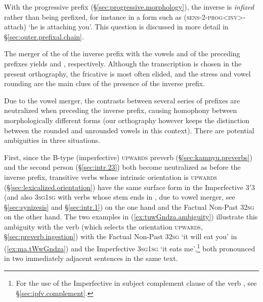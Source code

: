 With the progressive prefix  (§\ref{sec:progressive.morphology}), the inverse is \textit{infixed} rather than being prefixed, for instance in a form such as  (\textsc{sens}-2-\textsc{prog}<\textsc{inv}>-attach) `he is attaching you'. This question is discussed in more detail in §\ref{sec:outer.prefixal.chain}.

The merger of the  of the inverse prefix with the vowels  and  of the preceding prefixes yields  and , respectively.  Although the transcription  is chosen in the present orthography, the fricative  is most often elided, and the stress and vowel rounding are the main clues of the presence of the inverse prefix. 

Due to the vowel merger, the contrasts between several series of prefixes are neutralized when preceding the inverse prefix, causing homophony between morphologically different forms (our orthography however keeps the distinction between the rounded and unrounded vowels in this context). There are potential ambiguities in three situations.

First, since the B-type (imperfective) \textsc{upwards} preverb  (§\ref{sec:kamnyu.preverbs}) and the second person  (§\ref{sec:intr.23}) both become neutralized as  before the inverse prefix, transitive verbs whose intrinsic orientation is \textsc{upwards} (§\ref{sec:lexicalized.orientation}) have the same surface form in the Imperfective 3$'$\fl{}3 (and also \textsc{3sg}\fl{}\textsc{1sg} with verbs whose stem ends in , due to vowel merger, see §\ref{sec:synizesis} and §\ref{sec:intr.1}) on the one hand and the Factual Non-Past 3\fl{}\textsc{2sg} on the other hand. The two examples in (\ref{ex:tuwGndza.ambiguity}) illustrate this ambiguity with the verb  (which selects the orientation \textsc{upwards}, §\ref{sec:preverb.ingestion}) with the  Factual Non-Past 3\fl{}\textsc{2sg}  `it will eat you' in (\ref{ex:ma.tWwGndza}) and the Imperfective  \textsc{3sg}\fl{}\textsc{1sg} `it eats me',\footnote{For the use of the Imperfective in subject complement clause of the verb , see §\ref{sec:ipfv.complement}.} both pronounced  in two immediately adjacent sentences in the same text.

